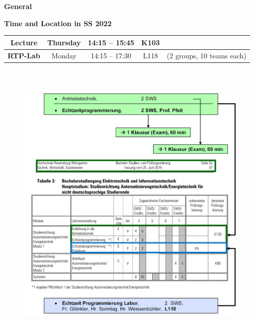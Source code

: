 \huge \textbf{General} \vspace{0.5cm}

\large \textbf{Time and Location in SS 2022} 

\begin{table}[h!]
\setlength{\tabcolsep}{10pt} %
\renewcommand{\arraystretch}{1.5} %
\begin{tabular}{|c|c|c|c|c|} \hline   
\textbf{Lecture}  & Thursday  & 14:15 – 15:45 & K103 &\\ \hline 
\textbf{RTP-Lab}  & Monday  & 14:15 – 17:30 & L118 &(2 groups, 10 teams each)\\ \hline  
 \end{tabular}
 \label{}
\end{table}

\begin{figure}[h]
\centering
\includegraphics[width=16cm, height=14cm]{Images/image190.png}
\label{fig:Fig }
\end{figure}
\newpage